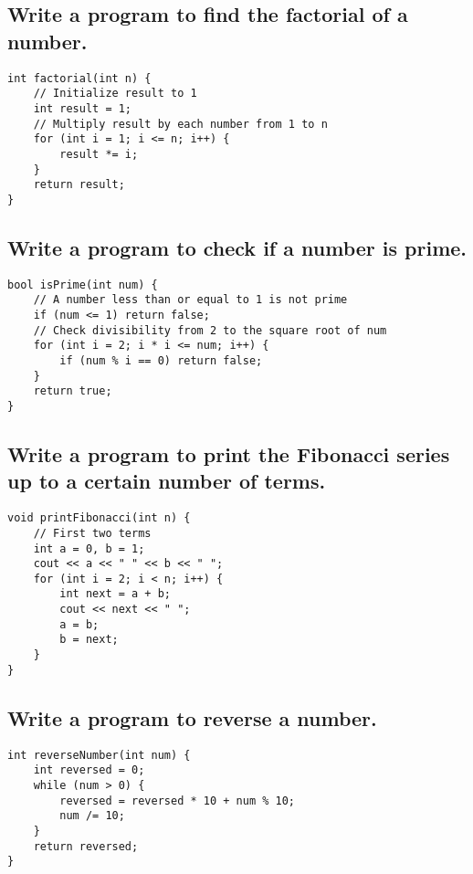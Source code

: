 \subsection{Write a program to find the factorial of a number.}
\begin{tcolorbox}[title=]
\begin{verbatim}
int factorial(int n) {
    // Initialize result to 1
    int result = 1;
    // Multiply result by each number from 1 to n
    for (int i = 1; i <= n; i++) {
        result *= i;
    }
    return result;
}
\end{verbatim}
\end{tcolorbox}

\subsection{Write a program to check if a number is prime.}
\begin{tcolorbox}[title=]
\begin{verbatim}
bool isPrime(int num) {
    // A number less than or equal to 1 is not prime
    if (num <= 1) return false;
    // Check divisibility from 2 to the square root of num
    for (int i = 2; i * i <= num; i++) {
        if (num % i == 0) return false;
    }
    return true;
}
\end{verbatim}
\end{tcolorbox}


\subsection{Write a program to print the Fibonacci series up to a certain number of terms.}
\begin{tcolorbox}[title=]
\begin{verbatim}
void printFibonacci(int n) {
    // First two terms
    int a = 0, b = 1;
    cout << a << " " << b << " ";
    for (int i = 2; i < n; i++) {
        int next = a + b;
        cout << next << " ";
        a = b;
        b = next;
    }
}
\end{verbatim}
\end{tcolorbox}


\subsection{Write a program to reverse a number.}
\begin{tcolorbox}[title=]
\begin{verbatim}  
int reverseNumber(int num) {
    int reversed = 0;
    while (num > 0) {
        reversed = reversed * 10 + num % 10;
        num /= 10;
    }
    return reversed;
}
\end{verbatim}
\end{tcolorbox}


